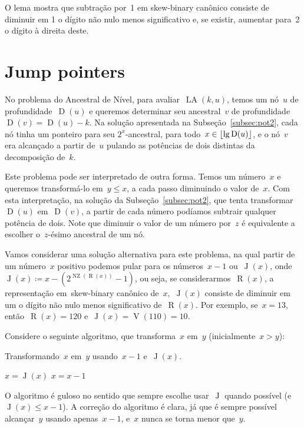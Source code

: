 \documentclass[main.tex]{subfiles}
\newcommand{\LA}{\operatorname{LA}}
\newcommand{\Dep}{\operatorname{D}}
\newcommand{\NZ}{\operatorname{NZ}}
\renewcommand{\V}{\operatorname{V}}
\newcommand{\R}{\operatorname{R}}
\newcommand{\J}{\operatorname{J}}
\begin{document}
O lema mostra que subtração por~1 em skew-binary canônico consiste de diminuir em 1 o dígito não nulo menos significativo e, se existir, aumentar para~2 o dígito à direita deste.

\section{Jump pointers}

No problema do Ancestral de Nível, para avaliar~$\LA(k, u)$, temos um nó~$u$ de profundidade~$\Dep(u)$ e queremos determinar seu ancestral~$v$ de profundidade~${\Dep(v) = \Dep(u) - k}$. Na solução apresentada na Subseção~\ref{subsec:pot2}, cada nó tinha um ponteiro para seu $2^x$-ancestral, para todo~${x \in \floor{\lg\Dep(u)}}$, e o nó~$v$ era alcançado a partir de~$u$ pulando as potências de dois distintas da decomposição de~$k$.

Este problema pode ser interpretado de outra forma. Temos um número~$x$ e queremos transformá-lo em~$y \leq x$, a cada passo diminuindo o valor de~$x$. Com esta interpretação, na solução da Subseção~\ref{subsec:pot2}, que tenta transformar~$\Dep(u)$ em~$\Dep(v)$, a partir de cada número podíamos subtrair qualquer potência de dois. Note que diminuir o valor de um número por~$z$ é equivalente a escolher o~$z$-ésimo ancestral de um nó.

Vamos considerar uma solução alternativa para este problema, na qual partir de um número~$x$ positivo podemos pular para os números~$x-1$ ou~$\J(x)$, onde~${\J(x) \coloneqq x - (2^{\NZ(\R(x))} - 1)}$, ou seja, se considerarmos~$\R(x)$, a representação em~skew-binary canônico de~$x$,~$\J(x)$ consiste de diminuir em um o dígito não nulo menos significativo de~$\R(x)$. Por exemplo, se~$x = 13$, então~${\R(x) = 120}$ e~${\J(x) = \V(110) = 10}$.

Considere o seguinte algoritmo, que transforma~$x$ em~$y$ (inicialmente~$x > y$):
\begin{algorithm}[h]
\caption{Transformando~$x$ em~$y$ usando~$x-1$ e~$\J(x)$. \label{lst:xysub}}
\begin{algorithmic}[1]
		\If{$\J(x) \geq y$}
			\State $x = \J(x)$
		\Else
			\State $x = x - 1$
		\EndIf
	\EndWhile
\end{algorithmic}
\end{algorithm}

O algoritmo é guloso no sentido que sempre escolhe usar~$\J$ quando possível (e~${\J(x) \leq x - 1}$). A correção do algoritmo é clara, já que é sempre possível alcançar~$y$ usando apenas~$x-1$, e~$x$ nunca se torna menor que~$y$.
\end{document}
